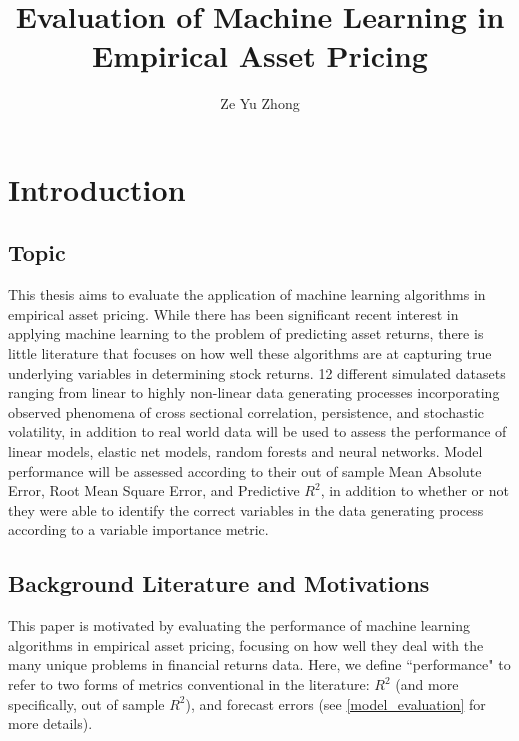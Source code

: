 \documentclass[a4paper, table]{article}
\title{Evaluation of Machine Learning in Empirical Asset Pricing}
\author{Ze Yu Zhong}
\begin{document}
\maketitle

\tableofcontents


\section{Introduction}

\subsection{Topic}

This thesis aims to evaluate the application of machine learning algorithms in empirical asset pricing. While there has been significant recent interest in applying machine learning to the problem of predicting asset returns, there is little literature that focuses on how well these algorithms are at capturing true underlying variables in determining stock returns. 12 different simulated datasets ranging from linear to highly non-linear data generating processes incorporating observed phenomena of cross sectional correlation, persistence, and stochastic volatility, in addition to real world data will be used to assess the performance of linear models, elastic net models, random forests and neural networks. Model performance will be assessed according to their out of sample Mean Absolute Error, Root Mean Square Error, and Predictive $R^2$, in addition to whether or not they were able to identify the correct variables in the data generating process according to a variable importance metric.

\subsection{Background Literature and Motivations}

This paper is motivated by evaluating the performance of machine learning algorithms in empirical asset pricing, focusing on how well they deal with the many unique problems in financial returns data. Here, we define ``performance" to refer to two forms of metrics conventional in the literature: $R^2$ (and more specifically, out of sample $R^2$), and forecast errors (see \ref{model_evaluation} for more details).
\end{document}
